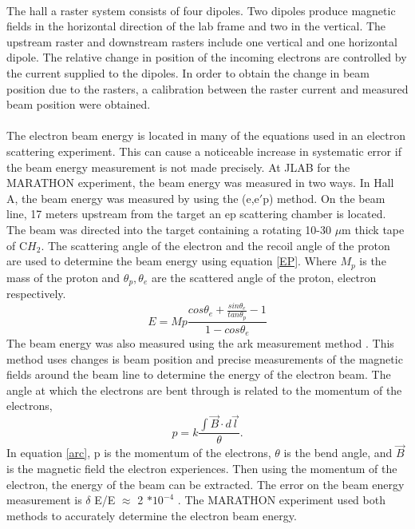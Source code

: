 	 \paragraph{} The hall a raster system consists of four dipoles. Two dipoles produce magnetic fields in the horizontal direction of the lab frame and two in the vertical. The upstream raster and downstream rasters include one vertical and one horizontal dipole. The relative change in position of the incoming electrons are controlled by the current supplied to the dipoles. In order to obtain the change in beam position due to the rasters, a calibration between the raster current and measured beam position were obtained.  
	 
	 \paragraph{}The electron beam energy is located in many of the equations used in an electron scattering experiment. This can cause a noticeable increase in systematic error if the beam energy measurement is not made precisely. At JLAB for the MARATHON experiment, the beam energy was measured in two ways. In Hall A, the beam energy was measured by using the (e,e$\prime$p) method. On the beam line, 17 meters upstream from the target an ep scattering chamber is located. The beam was directed into the target containing a rotating 10-30 $\mu$m thick tape of C$H_2$. The scattering angle of the electron and the recoil angle of the proton are used to determine the beam energy using equation \ref{EP}. Where $M_p$ is the mass of the proton and $\theta_p, \theta_e$ are the scattered angle of the proton, electron respectively. 
	\begin{equation}
	\label{EP}
	E = Mp \frac{cos\theta_e + \frac{sin\theta_e}{tan\theta_p}-1}{1 - cos\theta_e} 
	\end{equation}
	The beam energy was also measured using the ark measurement method \cite{Flay}. This method uses changes is beam position and precise measurements of the magnetic fields around the beam line to determine the energy of the electron beam. The angle at which the electrons are bent through is related to the momentum of the electrons,
	\begin{equation}
	\label{arc}
	p = k \frac{\int \vec{B} \cdot d\vec{l}}{\theta}.
	\end{equation}	
	In equation \ref{arc}, p is the momentum of the electrons, $\theta$ is the bend angle, and $\vec{B}$ is the magnetic field the electron experiences. Then using the momentum of the electron, the energy of the beam can be extracted. The error on the beam energy measurement is $\delta$ E/E $\approx$ 2 $* 10^{-4} $ \cite{EPMet, Flay}.  The MARATHON experiment used both methods to accurately determine the electron beam energy.
	
